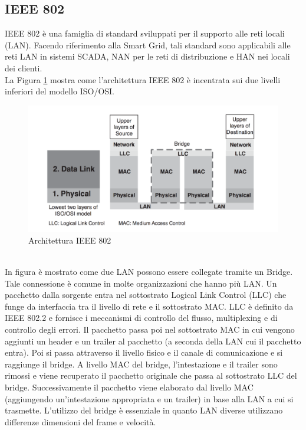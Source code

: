 \subsection{IEEE 802}
IEEE 802 è una famiglia di standard sviluppati per il supporto alle reti locali (LAN). Facendo riferimento alla Smart Grid, tali standard sono applicabili alle reti LAN in sistemi SCADA, NAN per le reti di distribuzione e HAN nei locali dei clienti.\\
La Figura \ref{fig:arch_802} mostra come l'architettura IEEE 802 è incentrata sui due livelli inferiori del modello ISO/OSI.
\begin{figure}[h]
	\centering
	\includegraphics[scale=0.320]{imgs/arch_ieee802.png}
	\caption{Architettura IEEE 802} \label{fig:arch_802}
\end{figure}
\\
In figura è mostrato come due LAN possono essere collegate tramite un Bridge. Tale connessione è comune in molte organizzazioni che hanno più LAN. Un pacchetto dalla sorgente entra nel sottostrato Logical Link Control (LLC) che funge da interfaccia tra il livello di rete e il sottostrato MAC. LLC è definito da IEEE 802.2 e fornisce i meccanismi di controllo del flusso, multiplexing e di controllo degli errori. Il pacchetto passa poi nel sottostrato MAC in cui vengono aggiunti un header e un trailer al pacchetto (a seconda della LAN cui il pacchetto entra). Poi si passa attraverso il livello fisico e il canale di comunicazione e si raggiunge il bridge. A livello MAC del bridge, l'intestazione e il trailer sono rimossi e viene recuperato il pacchetto originale che passa al sottostrato LLC del bridge. Successivamente il pacchetto viene elaborato dal livello MAC (aggiungendo un'intestazione appropriata e un trailer) in base alla LAN a cui si trasmette. L'utilizzo del bridge è essenziale in quanto LAN diverse utilizzano differenze dimensioni del frame e velocità.
